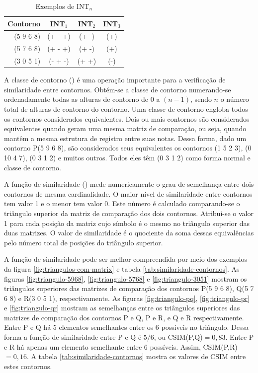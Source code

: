 \begin{table}
  \centering
  \begin{tabular}{r|ccc}
    Contorno & INT$_1$ & INT$_2$ & INT$_3$ \\
    \hline
    (5 9 6 8) & (+ - +) & (+ -) & (+) \\
    (5 7 6 8) & (+ - +) & (+ -) & (+) \\
    (3 0 5 1) & (- + -) & (+ +) & (-)
  \end{tabular}
  \caption{Exemplos de INT$_n$}
  \label{tab:int-contornos}
\end{table}

A classe de contorno () é uma operação importante para a
verificação de similaridade entre contornos. Obtém-se a classe de
contorno numerando-se ordenadamente todas as alturas de contorno de
$0$ a $(n-1)$, sendo $n$ o número total de alturas de contorno do
contorno. Uma classe de contorno engloba todos os contornos
considerados equivalentes. Dois ou mais contornos são considerados
equivalentes quando geram uma mesma matriz de comparação, ou seja,
quando mantêm a mesma estrutura de registro entre suas notas. Dessa
forma, dado um contorno P(5 9 6 8), são considerados seus equivalentes
os contornos (1 5 2 3), (0 10 4 7), (0 3 1 2) e muitos outros. Todos
eles têm (0 3 1 2) como forma normal e classe de contorno.

A função de similaridade () mede numericamente o grau de
semelhança entre dois contornos de mesma cardinalidade. O maior nível
de similaridade entre contornos tem valor 1 e o menor tem valor
0. Este número é calculado comparando-se o triângulo superior da
matriz de comparação dos dois contornos. Atribui-se o valor 1 para
cada posição da matriz cujo símbolo é o mesmo no triângulo superior
das duas matrizes. O valor de similaridade é o quociente da soma
dessas equivalências pelo número total de posições do triângulo
superior.

A função de similaridade pode ser melhor compreendida por meio dos
exemplos da figura \ref{fig:triangulos-com-matrix} e tabela
\ref{tab:similaridade-contornos}. As figuras \ref{fig:triangulo-5968},
\ref{fig:triangulo-5768} e \ref{fig:triangulo-3051} mostram os
triângulos superiores das matrizes de comparação dos contornos P(5 9 6
8), Q(5 7 6 8) e R(3 0 5 1), respectivamente. As figuras
\ref{fig:triangulo-pq}, \ref{fig:triangulo-pr} e
\ref{fig:triangulo-qr} mostram as semelhanças entre os triângulos
superiores das matrizes de comparação dos contornos P e Q, P e R, e Q
e R respectivamente. Entre P e Q há 5 elementos semelhantes entre os 6
possíveis no triângulo. Dessa forma a função de similaridade entre P e
Q é $5/6$, ou CSIM(P,Q)$=0,83$. Entre P e R há apenas um elemento
semelhante entre 6 possíveis. Assim, CSIM(P,R)$=0,16$. A tabela
\ref{tab:similaridade-contornos} mostra os valores de CSIM entre estes
contornos.

